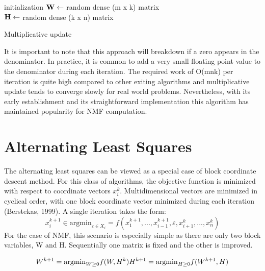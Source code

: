 \documentclass[final,leqno,onefignum,onetabnum]{siamltex1213}
\begin{document}
\begin{algorithm}[H]

 initialization\;
$\bf{W} \gets $ random dense (m x k) matrix\\
$\bf{H} \gets $ random dense (k x n) matrix\\
 \caption{Multiplicative update}
\end{algorithm} 

It is important to note that this approach will breakdown if a zero appears in the denominator. In practice, it is common to add a very small floating point value to the denominator during each iteration. The required work of O(mnk) per iteration is quite high compared to other exiting algorithms and multiplicative update tends to converge slowly for real world problems. Nevertheless, with its early establishment and its straightforward implementation this algorithm has maintained popularity for NMF computation. 

\section{Alternating Least Squares} The alternating least squares can be viewed as a special case of block coordinate descent method. For this class of algorithms, the objective function is minimized with respect to coordinate vectors $x^{k}_{i}$. Multidimensional vectors are minimized in cyclical order, with one block coordinate vector minimized during each iteration (Berstekas, 1999). A single iteration takes the form:
\begin{equation}\label{bcv1}
 x^{k+1}_{i} \in {\mathrm{argmin}_{\varepsilon \in X_i}} = f( x^{k+1}_{1}, ..., x^{k+1}_{i-1}, \varepsilon, x^{k}_{i+1}, ..., x^{k}_{n})
\end{equation}
For the case of NMF, this scenario is especially simple as there are only two block variables, W and H. Sequentially one matrix is fixed and the other is improved. 

\begin{equation}\label{bcv2}
W^{k+1} = {\mathrm{argmin}_{W \ge 0} f(W,H^k}) \\
H^{k+1} = {\mathrm{argmin}_{H \ge 0} f(W^{k+1},H})
\end{equation}
\end{document}
